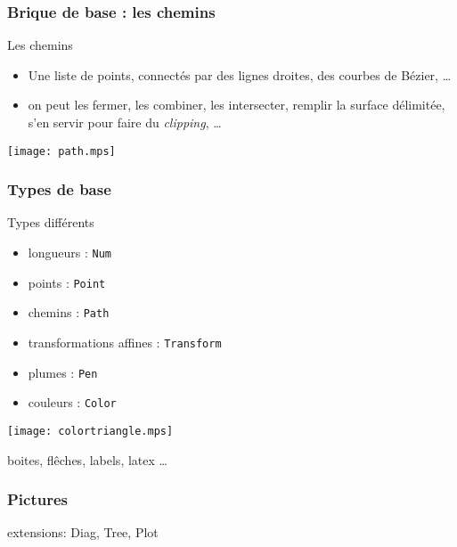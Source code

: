 \documentclass[nodefaultblocks]{beamer}
\begin{document}
\begin{frame}\frametitle{Brique de base : les chemins}
  \begin{block}{Les chemins}
    \begin{itemize}
      \item Une liste de points, connectés par des lignes droites, des courbes
        de Bézier, \dots
      \item on peut les fermer, les combiner, les intersecter, remplir la
        surface délimitée, s'en servir pour faire du {\em clipping}, \dots
    \end{itemize}
  \end{block}
  \begin{center}
  \texttt{[image: path.mps]}
  \end{center}
\end{frame}

\begin{frame}\frametitle{Types de base}

  \begin{block}{Types différents}
    \begin{itemize}
      \item longueurs : {\tt Num}
      \item points : {\tt Point}
      \item chemins : {\tt Path}
      \item transformations affines : {\tt Transform}
      \item plumes : {\tt Pen}
      \item couleurs : {\tt Color}
    \end{itemize}
  \end{block}

  \begin{center}
    \texttt{[image: colortriangle.mps]}
  \end{center}
  
\end{frame}

\begin{frame}
  boites, flêches, labels, latex \dots
\end{frame}

\begin{frame}\frametitle{Pictures}

\end{frame}

\begin{frame}
  extensions: Diag, Tree, Plot
\end{frame}
\end{document}
